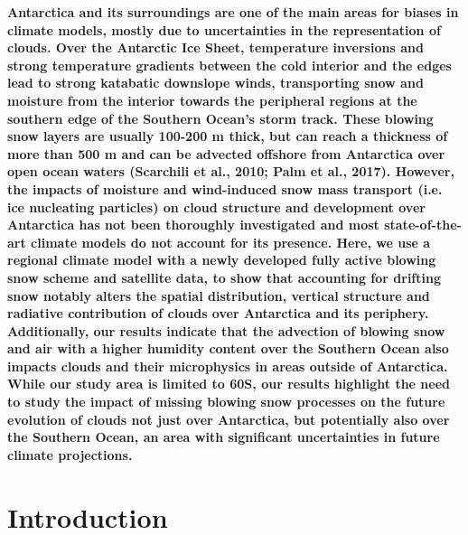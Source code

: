 \documentclass[12pt]{article}
\begin{document}
\textbf{Antarctica and its surroundings are one of the main areas for biases in climate models, mostly due to uncertainties in the representation of clouds. Over the Antarctic Ice Sheet, temperature inversions and strong temperature gradients between the cold interior and the edges lead to strong katabatic downslope winds, transporting snow and moisture from the interior towards the peripheral regions at the southern edge of the Southern Ocean’s storm track. These blowing snow layers are usually 100-200 m thick, but can reach a thickness of more than 500 m and can be advected offshore from Antarctica over open ocean waters (Scarchili et al., 2010; Palm et al., 2017). However, the impacts of moisture and wind-induced snow mass transport (i.e. ice nucleating particles) on cloud structure and development over Antarctica has not been thoroughly investigated and most state-of-the-art climate models do not account for its presence. Here, we use a regional climate model with a newly developed fully active blowing snow scheme and satellite data, to show that accounting for drifting snow notably alters the spatial distribution, vertical structure and radiative contribution of clouds over Antarctica and its periphery. Additionally, our results indicate that the advection of blowing snow and air with a higher humidity content over the Southern Ocean also impacts clouds and their microphysics in areas outside of Antarctica. While our study area is limited to 60S, our results highlight the need to study the impact of missing blowing snow processes on the future evolution of clouds not just over Antarctica, but potentially also over the Southern Ocean, an area with significant uncertainties in future climate projections.}


%
\section*{Introduction} 
\end{document}
